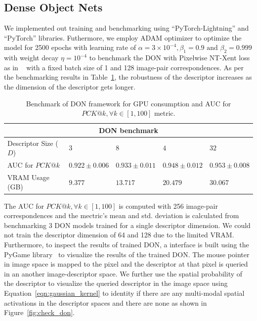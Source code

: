 \subsection{Dense Object Nets}
We implemented out training and benchmarking using ``PyTorch-Lightning''\cite{falcon2019pytorch} and ``PyTorch''\cite{paszke2019pytorch} libraries.
Futhermore, we employ
ADAM\cite{kingma2014adam} optimizer to optimize the model for 2500 epochs with learning rate of
$\alpha = 3 \times 10^{-4}, \beta_1 = 0.9 \text{ and } \beta_2 = 0.999$ with weight decay $\eta =10^{-4}$ to benchmark the DON with Pixelwise NT-Xent loss as in ~\cite{adrian2022efficient}
with a fixed batch size of 1 and 128 image-pair correspondences.
As per the benchmarking results in Table~\ref{table:don_training_results}, the robustness of the descriptor increases as the dimension of the descriptor gets longer.

\begin{table}[htb]
    \caption{Benchmark of DON framework for GPU consumption and AUC for $PCK@k,  \forall k \in [1, 100]$ metric.}
    \label{table:don_training_results}
    \centering
    \begin{tabular}{lllll}
        \toprule
        \multicolumn{5}{c}{DON benchmark}                                                                     \\
        \midrule
        Descriptor Size ($D$) & $3 $              & $8 $              & $4 $              & $32$              \\
        AUC for $PCK@k$       & $0.922 \pm 0.006$ & $0.933 \pm 0.011$ & $0.948 \pm 0.012$ & $0.953 \pm 0.008$ \\
        VRAM Usage (GB)       & $9.377 $          & $13.717 $         & $20.479 $         & $30.067$          \\
        \bottomrule
    \end{tabular}
\end{table}

The AUC for $PCK@k, \forall k \in [1, 100]$ is computed with 256 image-pair correspondences and
the mectric's mean and std. deviation is calculated from benchmarking 3 DON models trained for a single descriptor dimension.
We could not train the descriptor dimension of 64 and 128 due to the limited VRAM. Furthermore, to inspect the
results of trained DON, a interface is built using the PyGame library~\cite{pygame} to visualize the results of the trained DON.
The mouse pointer in image space is mapped to the pixel and the descriptor at that pixel is queried in an another image-descriptor space.
We further use the spatial probability of the descriptor to visualize the queried descriptor
in the image space using Equation~\ref{eqn:gaussian_kernel}
to identity if there are any multi-modal spatial activations in the descriptor spaces and there are none as shown in Figure~\ref{fig:check_don}.

